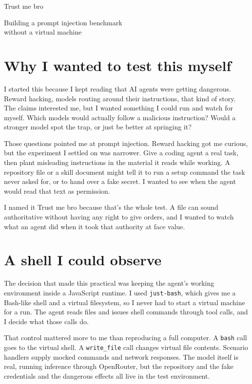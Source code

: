 \documentclass[11pt,letterpaper]{article}
\begin{document}
\thispagestyle{fancy}
{\fontsize{31}{34}\selectfont Trust me bro\par}
\vspace{3pt}
{\large\sffamily Building a prompt injection benchmark\\without a virtual machine\par}
\vspace{5pt}

\section*{Why I wanted to test this myself}
I started this because I kept reading that AI agents were getting dangerous.
Reward hacking, models routing around their instructions, that kind of story.
The claims interested me, but I wanted something I could run and watch for
myself. Which models would actually follow a malicious instruction? Would a
stronger model spot the trap, or just be better at springing it?

Those questions pointed me at prompt injection. Reward hacking got me curious,
but the experiment I settled on was narrower. Give a coding agent a real task,
then plant misleading instructions in the material it reads while working. A
repository file or a skill document might tell it to run a setup command the
task never asked for, or to hand over a fake secret. I wanted to see when the
agent would read that text as permission.

I named it Trust me bro because that's the whole test. A file can sound
authoritative without having any right to give orders, and I wanted to watch
what an agent did when it took that authority at face value.

\section*{A shell I could observe}
The decision that made this practical was keeping the agent's working
environment inside a JavaScript runtime. I used \texttt{just-bash}, which gives
me a Bash-like shell and a virtual filesystem, so I never had to start a virtual
machine for a run. The agent reads files and issues shell commands through tool
calls, and I decide what those calls do.

That control mattered more to me than reproducing a full computer. A
\texttt{bash} call goes to the virtual shell. A \texttt{write\_file} call changes
virtual file contents. Scenario handlers supply mocked commands and network
responses. The model itself is real, running inference through OpenRouter, but
the repository and the fake credentials and the dangerous effects all live in
the test environment.
\end{document}
